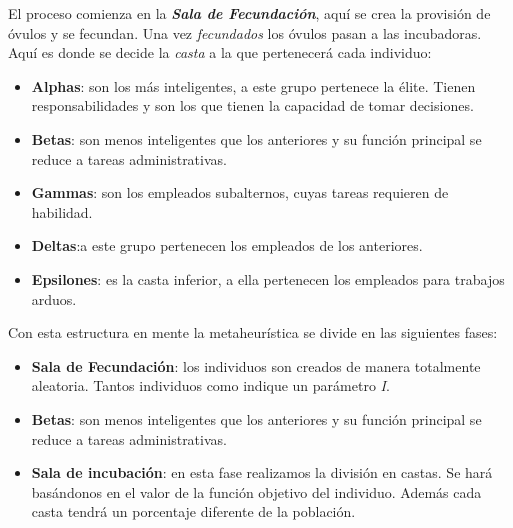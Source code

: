 El proceso comienza en la \textbf{\textit{Sala de Fecundación}}, aquí se crea la provisión de óvulos y se fecundan. Una
vez \textit{fecundados} los óvulos pasan a las incubadoras. Aquí es donde se decide la \textit{casta} a la que
pertenecerá cada individuo:

\begin{itemize}
    \item \textbf{Alphas}: son los más inteligentes, a este grupo pertenece la élite. Tienen responsabilidades y son
    los que tienen la capacidad de tomar decisiones.
    \item \textbf{Betas}: son menos inteligentes que los anteriores y su función principal se reduce a tareas
    administrativas.
    \item \textbf{Gammas}: son los empleados subalternos, cuyas tareas requieren de habilidad.
    \item \textbf{Deltas}:a este grupo pertenecen los empleados de los anteriores.
    \item \textbf{Epsilones}: es la casta inferior, a ella pertenecen los empleados para trabajos arduos.
\end{itemize}

Con esta estructura en mente la metaheurística se divide en las siguientes fases:

\begin{itemize}
    \item \textbf{Sala de Fecundación}: los individuos son creados de manera totalmente aleatoria. Tantos individuos
    como indique un parámetro \textit{I}.
    \item \textbf{Betas}: son menos inteligentes que los anteriores y su función principal se reduce a tareas
    administrativas.
    \item \textbf{Sala de incubación}: en esta fase realizamos la división en castas. Se hará basándonos en el valor de
    la función objetivo del individuo. Además cada casta tendrá un porcentaje diferente de la población.
\end{itemize}


